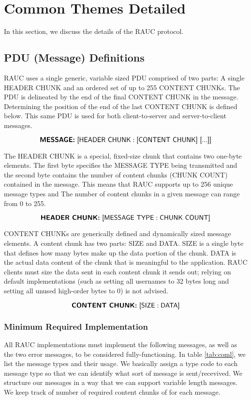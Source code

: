 \section{Common Themes Detailed}
\label{sec:ct}

In this section, we discuss the details of the \textsf{RAUC} protocol.

\subsection{PDU (Message) Definitions}
RAUC uses a single generic, variable sized PDU comprised of two parts: A single HEADER CHUNK and an ordered set of up to 255 CONTENT CHUNKs. The PDU is delineated by the end of the final CONTENT CHUNK in the message. Determining the position of the end of the last CONTENT CHUNK is defined below. This same PDU is used for both client-to-server and server-to-client messages.

\[\textsf{\textbf{MESSAGE:} [HEADER CHUNK} : \textsf{[CONTENT CHUNK] [...]]}\]

The HEADER CHUNK is a special, fixed-size chunk that contains two one-byte elements. The first byte specifies the MESSAGE TYPE being transmitted and the second byte contains the number of content chunks (CHUNK COUNT) contained in the message. This means that RAUC supports up to 256 unique message types and The number of content chunks in a given message can range from 0 to 255.

\[\textsf{\textbf{HEADER CHUNK:} [MESSAGE TYPE} : \textsf{CHUNK COUNT]}\]

CONTENT CHUNKs are generically defined and dynamically sized message elements. A content chunk has two parts: SIZE and DATA. SIZE is a single byte that defines how many bytes make up the data portion of the chunk. DATA is the actual data content of the chunk that is meaningful to the application. RAUC clients must size the data sent in each content chunk it sends out; relying on default implementations (such as setting all usernames to 32 bytes long and setting all unused high-order bytes to 0) is not advised.

\[\textsf{\textbf{CONTENT CHUNK:} [SIZE} : \textsf{DATA]}\]



\subsubsection{Minimum Required Implementation}
All RAUC implementations must implement the following  messages, as well as the two error messages, to be considered fully-functioning. In table \ref{tab:coml}, we list the message types and their usage. We basically assign a type code to each message type so that we can identify what sort of message is sent/recevived. We structure our messages in a way that we can support variable length messages. We keep track of number of required content chunks of for each message. 

